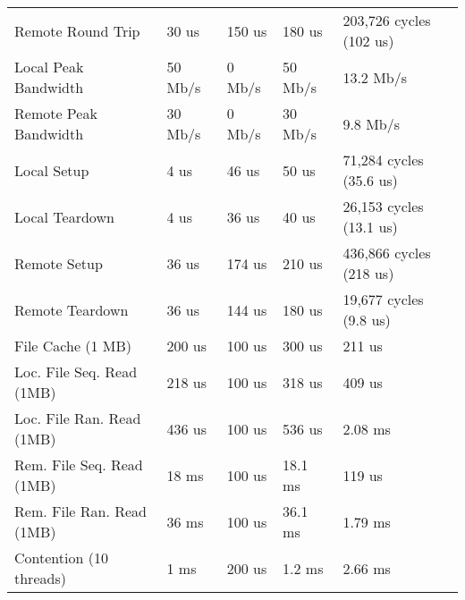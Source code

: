 \documentclass[paper=a4, fontsize=11pt]{scrartcl}
\numberwithin{equation}{section}        %
\numberwithin{figure}{section}          %
\numberwithin{table}{section}               %
\begin{document}
\begin{center}
\begin{tabular}{ | l | l | l | l | l |}
    Remote Round Trip & 30 us & 150 us & 180 us & 203,726 cycles (102 us) \\
    Local Peak Bandwidth & 50 Mb/s & 0 Mb/s & 50 Mb/s & 13.2 Mb/s \\
    Remote Peak Bandwidth & 30 Mb/s & 0 Mb/s & 30 Mb/s & 9.8 Mb/s \\
    Local Setup & 4 us & 46 us & 50 us & 71,284 cycles (35.6 us) \\ 
    Local Teardown & 4 us & 36 us & 40 us & 26,153 cycles (13.1 us) \\ 
    Remote Setup & 36 us & 174 us & 210 us & 436,866 cycles (218 us) \\
    Remote Teardown & 36 us & 144 us & 180 us & 19,677 cycles (9.8 us) \\
    File Cache (1 MB) & 200 us & 100 us & 300 us & 211 us \\ 
    Loc. File Seq. Read (1MB) & 218 us & 100 us & 318 us & 409 us \\ 
    Loc. File Ran. Read (1MB) & 436 us & 100 us & 536 us & 2.08 ms \\ 
    Rem. File Seq. Read (1MB) & 18 ms & 100 us & 18.1 ms & 119 us \\ 
    Rem. File Ran. Read (1MB) & 36 ms & 100 us & 36.1 ms & 1.79 ms \\ 
    Contention (10 threads) & 1 ms & 200 us & 1.2 ms & 2.66 ms \\
    \hline
    \end{tabular}
\end{center}



\end{document}
